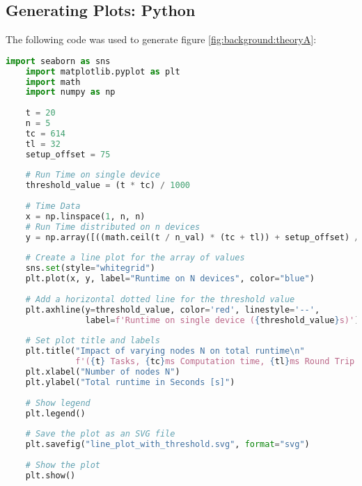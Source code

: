 \subsection{Generating Plots: Python}
\label{app:code:theoryplots}

The following code was used to generate figure \ref{fig:background:theoryA}:
\begin{lstlisting}[language=Python, frame=tb, caption={Ploting execution time (variable nodes)}]
    import seaborn as sns
    import matplotlib.pyplot as plt
    import math
    import numpy as np
    
    t = 20
    n = 5
    tc = 614
    tl = 32
    setup_offset = 75
    
    # Run Time on single device
    threshold_value = (t * tc) / 1000
    
    # Time Data
    x = np.linspace(1, n, n)
    # Run Time distributed on n devices
    y = np.array([((math.ceil(t / n_val) * (tc + tl)) + setup_offset) / 1000 for n_val in x])
    
    # Create a line plot for the array of values
    sns.set(style="whitegrid")
    plt.plot(x, y, label="Runtime on N devices", color="blue")
    
    # Add a horizontal dotted line for the threshold value
    plt.axhline(y=threshold_value, color='red', linestyle='--',
                label=f'Runtime on single device ({threshold_value}s)')
    
    # Set plot title and labels
    plt.title("Impact of varying nodes N on total runtime\n"
              f'({t} Tasks, {tc}ms Computation time, {tl}ms Round Trip Time, {setup_offset}ms Offset)')
    plt.xlabel("Number of nodes N")
    plt.ylabel("Total runtime in Seconds [s]")
    
    # Show legend
    plt.legend()
    
    # Save the plot as an SVG file
    plt.savefig("line_plot_with_threshold.svg", format="svg")
    
    # Show the plot
    plt.show()
\end{lstlisting}

